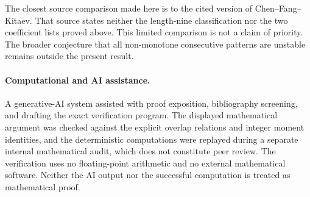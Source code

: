 \documentclass[11pt]{article}
\begin{document}
The closest source comparison made here is to the cited version of
Chen--Fang--Kitaev.  That source states neither the length-nine classification
nor the two coefficient lists proved above.  This limited comparison is not a
claim of priority.  The broader conjecture that all non-monotone consecutive
patterns are unstable remains outside the present result.

\paragraph{Computational and AI assistance.}
A generative-AI system assisted with proof exposition, bibliography screening,
and drafting the exact verification program.  The displayed mathematical
argument was checked against the explicit overlap relations and integer moment
identities, and the deterministic computations were replayed during a separate
internal mathematical audit, which does not constitute peer review.  The
verification uses no floating-point arithmetic and no external mathematical
software.  Neither the AI output nor the successful computation is treated as
mathematical proof.



\end{document}
